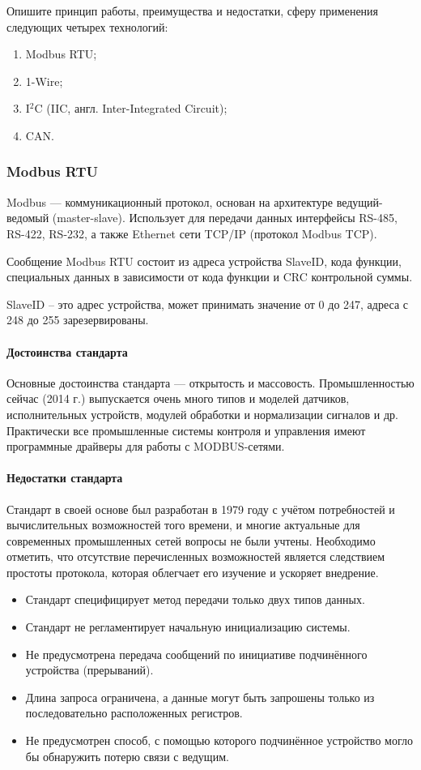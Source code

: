 \documentclass[a4paper,14pt]{extarticle}
\begin{document}
\begin{problem}
	Опишите принцип работы, преимущества и недостатки, сферу применения следующих
	четырех технологий:
	\begin{enumerate}
		\item Modbus RTU;
		\item  1-Wire;
		\item  I${}^2$C (IIC, англ. Inter-Integrated Circuit);
		\item  CAN.
	\end{enumerate}
	\nonum
	\subsubsection*{Modbus RTU}
	
	Modbus --- коммуникационный протокол, основан на архитектуре ведущий-ведомый (master-slave). Использует для передачи данных интерфейсы RS-485, RS-422, RS-232, а также Ethernet сети TCP/IP (протокол Modbus TCP).
	
	Сообщение Modbus RTU состоит из адреса устройства SlaveID, кода функции, специальных данных в зависимости от кода функции и CRC контрольной суммы.
	
	SlaveID – это адрес устройства, может принимать значение от 0 до 247, адреса с 248 до 255 зарезервированы.
	
	\paragraph*{Достоинства стандарта}
	Основные достоинства стандарта — открытость и массовость. Промышленностью сейчас (2014 г.) выпускается очень много типов и моделей датчиков, исполнительных устройств, модулей обработки и нормализации сигналов и др. Практически все промышленные системы контроля и управления имеют программные драйверы для работы с MODBUS-сетями.
	
	\paragraph*{Недостатки стандарта}
	Стандарт в своей основе был разработан в 1979 году с учётом потребностей и вычислительных возможностей того времени, и многие актуальные для современных промышленных сетей вопросы не были учтены. Необходимо отметить, что отсутствие перечисленных возможностей является следствием простоты протокола, которая облегчает его изучение и ускоряет внедрение.
	
	\begin{itemize}
		\item Стандарт специфицирует метод передачи только двух типов данных. 
		\item Стандарт не регламентирует начальную инициализацию системы.
		\item Не предусмотрена передача сообщений по инициативе подчинённого устройства (прерываний). 
		\item Длина запроса ограничена, а данные могут быть запрошены только из последовательно расположенных регистров. 
		\item Не предусмотрен способ, с помощью которого подчинённое устройство могло бы обнаружить потерю связи с ведущим.
	\end{itemize}
	

\end{problem}
\end{document}
